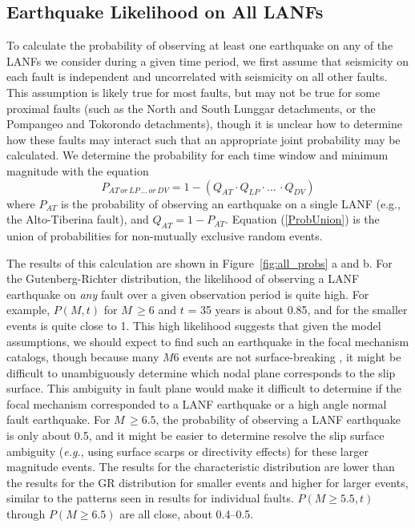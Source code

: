 \documentclass[twocolumn,grl]{AGUTeX}
\begin{document}
\begin{article}
\subsection{Earthquake Likelihood on All LANFs}
To calculate the probability of observing at least one earthquake on any of the LANFs we consider during a given time period, we first assume that seismicity on
each fault is independent and uncorrelated with seismicity on all
other faults. This assumption is likely true for most faults, but may
not be true for some proximal faults (such as the North and South
Lunggar detachments, or the Pompangeo and Tokorondo detachments),
though it is unclear how to determine how these faults may interact 
such that an appropriate joint probability may be calculated. 
We determine the probability for each time window and minimum magnitude
with the equation
\begin{equation}
P_{AT \, or \, LP\, \ldots \, or \, DV} = 1 - (Q_{AT} \cdot Q_{LP} \cdot \ldots \, \cdot Q_{DV})
\label{ProbUnion}
\end{equation}
where $P_{AT}$ is the probability of observing an earthquake on a
single LANF (e.g., the Alto-Tiberina fault), and $Q_{AT} = 1 -
P_{AT}$. Equation (\ref{ProbUnion}) is the union of probabilities for
non-mutually exclusive random events.

The results of this calculation are shown in Figure~\ref{fig:all_probs} a and b.
For the Gutenberg-Richter distribution, the likelihood of observing a LANF
earthquake on \emph{any} fault over a given observation period is quite high.
For example, $P(M,t)$ for $M \, \ge 6$ and $t$ = 35 years is about 0.85, and
for the smaller events is quite close to 1.
This high likelihood suggests that given the model assumptions, we should
expect to find such an earthquake in the focal mechanism catalogs, though
because many $M6$ events are not surface-breaking \citep{hecker2013eqdist}, it might be difficult to unambiguously determine which nodal plane corresponds to the slip surface. This ambiguity in fault plane would make it difficult to determine if the focal mechanism corresponded to a LANF earthquake or a high angle normal fault earthquake. For $M \, \ge 6.5$, the probability of observing a LANF earthquake is only about 0.5, and it might be easier to determine resolve the slip surface ambiguity ({\it e.g.}, using surface scarps or directivity effects) for these larger magnitude events. 
The results for the characteristic distribution are lower than the results
for the GR distribution for smaller events
and higher for larger events, similar to the patterns seen in results 
for individual faults. $P(M\ge5.5,t)$ through $P(M\ge6.5)$ are all
close, about 0.4--0.5.  



\end{article}
\end{document}
